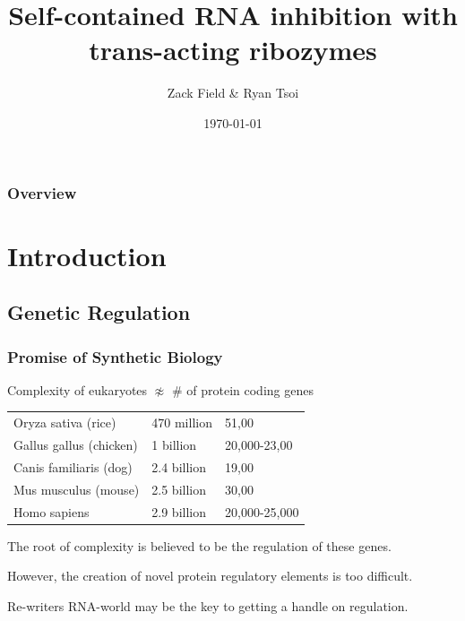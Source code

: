 \documentclass{beamer}
\title[RNA circuits]{Self-contained RNA inhibition with trans-acting ribozymes} %
\author{Zack Field \& Ryan Tsoi} %
\institute[UC Berkeley] %
{
University of California \\ %
\medskip
\textit{field.zackery@berkeley.edu, ryantsoi@berkeley.edu} %
}
\date{\today} %
\begin{document}
\begin{frame}
\titlepage %
\end{frame}

\begin{frame}
\frametitle{Overview} %
\tableofcontents 
\end{frame}


\section{Introduction} %

\subsection{Genetic Regulation} %

\begin{frame}
\frametitle{Promise of Synthetic Biology}

Complexity of eukaryotes $\not\approx$ \# of protein coding genes

\begin{tabular}{l | l | l}
\hline
Oryza sativa (rice)& 470 million & 51,00\\
Gallus gallus (chicken)& 1 billion& 20,000-23,00\\ 
Canis familiaris (dog)& 2.4 billion& 19,00 \\
Mus musculus (mouse)& 2.5 billion& 30,00 \\
Homo sapiens & 2.9 billion& 20,000-25,000\\
\hline
\end{tabular}

\bigskip
The root of complexity is believed to be the regulation of these genes.

However, the creation of novel protein regulatory elements is too difficult.

Re-writers RNA-world may be the key to getting a handle on regulation.           
\end{frame}
\end{document}
